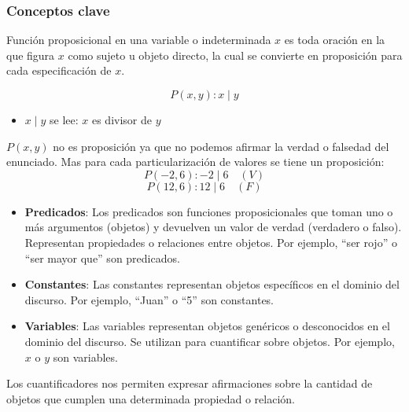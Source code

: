 \subsubsection{Conceptos clave}
\vspace{1em}
\begin{fmd-definition} 
	Función proposicional en una variable o indeterminada $x$ es toda oración en la que figura $x$ como sujeto u objeto directo, la cual se convierte en proposición para cada especificación de $x$.
\end{fmd-definition}

\begin{fmd-example}
	\[ P(x, y): x \mid y \]
	
	\begin{itemize}
		\item $x \mid y$ se lee: $x$ es divisor de $y$
	\end{itemize}
	
	$P(x, y)$ no es proposición ya que no podemos afirmar la verdad o falsedad del enunciado. Mas para cada particularización de valores se tiene un proposición:
	\[ 
	P(-2, 6): -2 \mid 6 \quad (V)
	\]
	\[ P(12, 6): 12 \mid 6 \quad (F) \]
\end{fmd-example}

\begin{itemize}
	\item \textbf{Predicados}: Los predicados son funciones proposicionales que toman uno o más argumentos (objetos) y devuelven un valor de verdad (verdadero o falso). Representan propiedades o relaciones entre objetos. Por ejemplo, ``ser rojo'' o ``ser mayor que'' son predicados. 
	\item \textbf{Constantes}: Las constantes representan objetos específicos en el dominio del discurso. Por ejemplo, ``Juan'' o ``5'' son constantes.
	\item \textbf{Variables}: Las variables representan objetos genéricos o desconocidos en el dominio del discurso. Se utilizan para cuantificar sobre objetos. Por ejemplo, $x$ o $y$ son variables.
\end{itemize}

Los cuantificadores nos permiten expresar afirmaciones sobre la cantidad de objetos que cumplen una determinada propiedad o relación.

